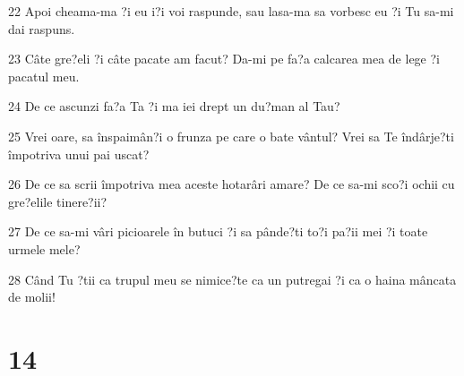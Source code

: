 \par 22 Apoi cheama-ma ?i eu i?i voi raspunde, sau lasa-ma sa vorbesc eu ?i Tu sa-mi dai raspuns.
\par 23 Câte gre?eli ?i câte pacate am facut? Da-mi pe fa?a calcarea mea de lege ?i pacatul meu.
\par 24 De ce ascunzi fa?a Ta ?i ma iei drept un du?man al Tau?
\par 25 Vrei oare, sa înspaimân?i o frunza pe care o bate vântul? Vrei sa Te îndârje?ti împotriva unui pai uscat?
\par 26 De ce sa scrii împotriva mea aceste hotarâri amare? De ce sa-mi sco?i ochii cu gre?elile tinere?ii?
\par 27 De ce sa-mi vâri picioarele în butuci ?i sa pânde?ti to?i pa?ii mei ?i toate urmele mele?
\par 28 Când Tu ?tii ca trupul meu se nimice?te ca un putregai ?i ca o haina mâncata de molii!

\chapter{14}

